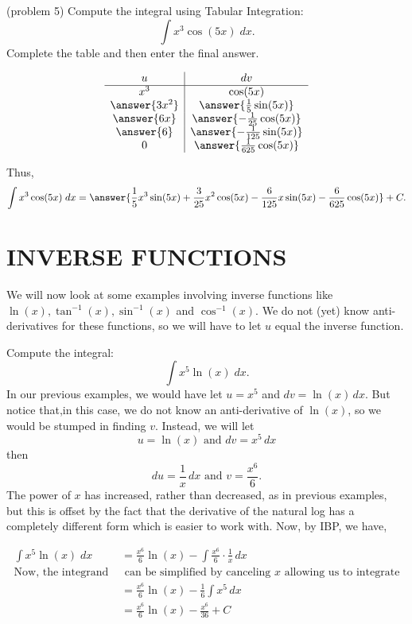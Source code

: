 \documentclass{ximera}
\begin{document}
\begin{problem}(problem 5)
Compute the integral using Tabular Integration:
  \[
  \int x^3 \cos(5x) \;dx.
  \]
Complete the table and then enter the final answer.
\begin{center}
\[
\begin{array}{c|c}
		u & dv  \\\hline 
		x^3 & \cos(5x) \\ 
     \answer{3x^2} & \answer{\frac15 \sin(5x)} \\ 
      \answer{6x} & \answer{-\frac{1}{25} \cos(5x)} \\ 
       \answer{6} & \answer{-\frac{1}{125} \sin(5x)} \\
       0 & \answer{\frac{1}{625} \cos(5x)} 
	\end{array}
    \]
\end{center}



Thus,
\[
  \int x^3 \cos(5x) \;dx = \answer{\frac15 x^3\sin(5x) + \frac{3}{25}x^2 \cos(5x) - \frac{6}{125}x\sin(5x) -\frac{6}{625}\cos(5x)} +C.
  \]
\end{problem}



\section{INVERSE FUNCTIONS}

We will now look at some examples involving inverse functions like $\ln(x), \tan^{-1}(x), \sin^{-1}(x)$ and $\cos^{-1}(x)$.
We do not (yet) know anti-derivatives for these functions, so we will have to let $u$ equal the inverse function.
 
\begin{example}[example 6]
Compute the integral:
  \[
  \int x^5\ln(x) \;dx.
  \]
In our previous examples, we would have let $u = x^5$ and $dv = \ln(x) \, dx$.
But notice that,in this case, we do not know an anti-derivative of $\ln(x)$, so 
we would be stumped in finding $v$. Instead, we will let 
\[
u = \ln(x)  \text{   and   } dv = x^5 \, dx\]
then
\[
du = \frac{1}{x} \, dx \text{   and   } v = \frac{x^6}{6}.
\]
The power of $x$ has increased, rather than decreased, as in previous examples, but this 
is offset by the fact that the derivative of the natural log has a completely different form
which is easier to work with. Now, by IBP, we have,

\begin{align*}
  \int x^5\ln(x) \;dx &= \frac{x^6}{6}\ln(x) - \int \frac{x^6}{6}\cdot \frac{1}{x} \, dx\\
\text{Now, the integrand } & \text{ can be simplified by canceling $x$ allowing us to integrate}\\
&= \frac{x^6}{6}\ln(x) - \frac16\int x^5 \, dx\\
&= \frac{x^6}{6}\ln(x) -  \frac{x^6}{36} + C\\
\end{align*}

\end{example}
\end{document}
